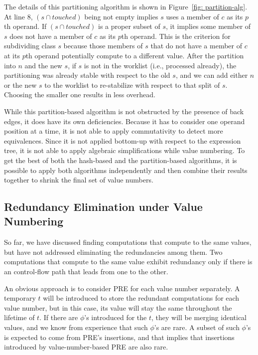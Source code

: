 The details of this partitioning algorithm is shown in
Figure~\ref{fig: partition-alg}.  At line 8, $(s \cap touched)$ being
not empty implies $s$ uses a member of $c$ as its $p$th operand.  If
$(s \cap touched)$ is a proper subset of $s$, it implies some member of $s$ 
does not have a member
of $c$ as its $p$th operand.  This is the criterion for subdividing
class $s$ because those members of $s$ that do not have a member of $c$ at
its $p$th operand potentially compute to a different value.  
After the partition into $n$ and the new $s$,
if $s$ is not in the worklist (i.e., processed already), the 
partitioning was already stable with respect to the old $s$, and
we can add either $n$ or the new $s$ to the worklist to re-stabilize with
respect to that split of $s$.  Choosing the smaller one results in less
overhead.

While this partition-based algorithm is not obstructed by the presence of
back edges, it does have its own deficiencies.  Because it has to consider
one operand position at a time, it is not able to apply commutativity to
detect more equivalences.  Since it is not applied bottom-up with respect to
the expression tree, it is not able to apply algebraic simplifications
while value numbering.
To get the best of both the hash-based and the partition-based algorithms,
it is possible to apply both algorithms independently and then combine their
results together to shrink the final set of value numbers.

\subsection{Redundancy Elimination under Value Numbering}

So far, we have discussed finding computations that compute to the
same values, but have not addressed eliminating the redundancies
among them.  Two computations that compute to the same value exhibit redundancy 
only if there is an control-flow path that leads from one to the other.

An obvious approach is to consider PRE for each value
number separately.  A temporary $t$ will be introduced to store the redundant
computations for each value number, but in this case, its value will stay the 
same throughout the lifetime of $t$.  If there are $\phi$'s introduced for
the $t$, they will be merging identical values, and we know from
experience that such $\phi$'s are rare.  A subset of such $\phi$'s is expected 
to come from PRE's insertions, and that implies that insertions
introduced by value-number-based PRE are also rare.

